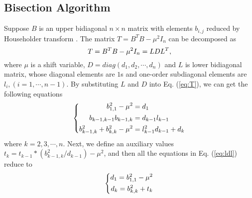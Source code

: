 \subsection{Bisection Algorithm}\label{subsec:bisection}
\vspace{-0.1in}
Suppose $B$ is an upper bidiagonal $n \times n$ matrix with elements $b_{i,j}$ reduced by Householder transform \cite{10householder}.
The matrix $T = B^T B - \mu^2 I_n$ can be decomposed as
\begin{equation}
\label{eq:T}
\vspace{-0.05in}
T = B^T B - \mu^2 I_n = L D L^T ,
\vspace{-0.05in}
\end{equation}
where $\mu$ is a shift variable, $D=diag(d_1,d_2,\cdots,d_n)$ and $L$ is lower bidiagonal matrix, whose diagonal elements are $1$s and one-order subdiagonal elements are $l_{i}, (i=1,\cdots,n-1)$.
By substituting $L$ and $D$ into Eq. (\ref{eq:T}), we can get the following equations
\[ \vspace{-0.05in}
\left \{ \begin{aligned}
b_{1,1}^2 - \mu^2 &= d_1\\
b_{k-1,k-1} b_{k-1,k} &= d_{k-1} l_{k-1}\\
b_{k-1,k}^2 + b_{k,k}^2 - \mu^2 &= l_{k-1}^2 d_{k-1} + d_k
\vspace{-0.05in}
\end{aligned} \right . \label{eq:ldl} 
\vspace{-0.05in} \]
where $k = 2,3,\cdots,n$.
Next, we define an auxiliary values $t_{k} = t_{k-1} * (b_{k-1,k}^2 / d_{k-1}) - \mu^2$, and then all the equations in Eq. (\ref{eq:ldl}) reduce to
\begin{equation}
\vspace{-0.05in}
\left \{
\begin{aligned}
d_1 = b_{1,1}^2 - \mu^2 \\
d_k = b_{k,k}^2 + t_{k}
\end{aligned}
\right .
\label{eq:negcount}
\vspace{-0.05in}
\end{equation}

